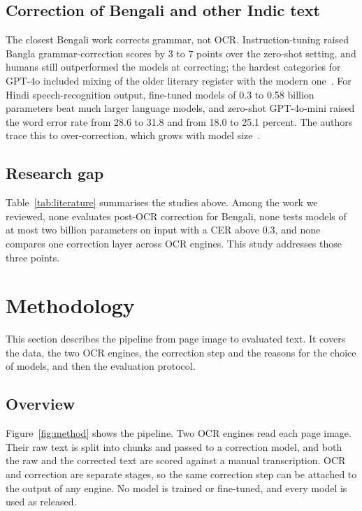 \documentclass[conference]{IEEEtran}
\begin{document}
\subsection{Correction of Bengali and other Indic text}
The closest Bengali work corrects grammar, not OCR. Instruction-tuning raised Bangla grammar-correction scores by 3 to 7 points over the zero-shot setting, and humans still outperformed the models at correcting; the hardest categories for GPT-4o included mixing of the older literary register with the modern one~\cite{bhattacharyya2025banglagec}. For Hindi speech-recognition output, fine-tuned models of 0.3 to 0.58 billion parameters beat much larger language models, and zero-shot GPT-4o-mini raised the word error rate from 28.6 to 31.8 and from 18.0 to 25.1 percent. The authors trace this to over-correction, which grows with model size~\cite{kumar2026postasr}.

\subsection{Research gap}
Table~\ref{tab:literature} summarises the studies above. Among the work we reviewed, none evaluates post-OCR correction for Bengali, none tests models of at most two billion parameters on input with a CER above 0.3, and none compares one correction layer across OCR engines. This study addresses those three points.



\section{Methodology}

This section describes the pipeline from page image to evaluated text. It covers the data, the two OCR engines, the correction step and the reasons for the choice of models, and then the evaluation protocol.

\subsection{Overview}
Figure~\ref{fig:method} shows the pipeline. Two OCR engines read each page image. Their raw text is split into chunks and passed to a correction model, and both the raw and the corrected text are scored against a manual transcription. OCR and correction are separate stages, so the same correction step can be attached to the output of any engine. No model is trained or fine-tuned, and every model is used as released.
\end{document}
